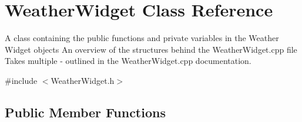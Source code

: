 \hypertarget{class_weather_widget}{}\section{Weather\+Widget Class Reference}
\label{class_weather_widget}


A class containing the public functions and private variables in the Weather Widget objects  An overview of the structures behind the Weather\+Widget.\+cpp file  Takes multiple -\/ outlined in the Weather\+Widget.\+cpp documentation.  




{\ttfamily \#include $<$Weather\+Widget.\+h$>$}

\subsection*{Public Member Functions}
